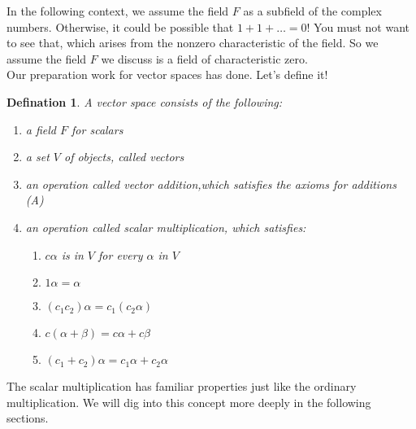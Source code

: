 \documentclass{article}
\begin{document}
\indent In the following context, we assume the field $F$ as a subfield of the complex numbers. Otherwise, it could be possible that $1+1+\dots =0$! You must not want to see that, which arises from the nonzero characteristic of the field. So we assume the field $F$ we discuss is a field of characteristic zero.\\
\indent Our preparation work for vector spaces has done. Let's define it!
\theoremstyle{defination}\newtheorem{dde}{Defination}[section]
\begin{dde}
	A vector space consists of the following:
	\begin{enumerate}
		\item a field $F$ for scalars
		\item a set $V$ of objects, called vectors
		\item an operation called vector addition,which satisfies the axioms for additions (A)
		\item an operation called scalar multiplication, which satisfies:
		\begin{enumerate}
			\item[(a)] $c\alpha$ is in $V$ for every $\alpha$ in $V$
			\item[(b)] $1\alpha=\alpha$
			\item[(c)] $(c_1c_2)\alpha=c_1(c_2\alpha)$
			\item[(d)] $c(\alpha+\beta)=c\alpha+c\beta$
			\item[(e)] $(c_1+c_2)\alpha=c_1\alpha+c_2\alpha$
		\end{enumerate}
	\end{enumerate}
\end{dde}
The scalar multiplication has familiar properties just like the ordinary multiplication. We will dig into this concept more deeply in the following sections.
\end{document}

